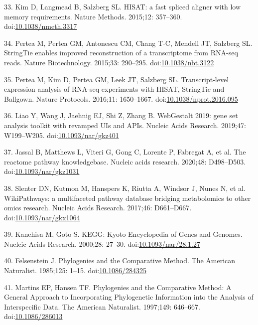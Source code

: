 \documentclass[]{elsarticle} %
\begin{document}
\leavevmode\hypertarget{ref-HISAT}{}%
33. Kim D, Langmead B, Salzberg SL. HISAT: a fast spliced aligner with
low memory requirements. Nature Methods. 2015;12: 357--360.
doi:\href{https://doi.org/10.1038/nmeth.3317}{10.1038/nmeth.3317}

\leavevmode\hypertarget{ref-StringTie}{}%
34. Pertea M, Pertea GM, Antonescu CM, Chang T-C, Mendell JT, Salzberg
SL. StringTie enables improved reconstruction of a transcriptome from
RNA-seq reads. Nature Biotechnology. 2015;33: 290--295.
doi:\href{https://doi.org/10.1038/nbt.3122}{10.1038/nbt.3122}

\leavevmode\hypertarget{ref-Tuxedo}{}%
35. Pertea M, Kim D, Pertea GM, Leek JT, Salzberg SL. Transcript-level
expression analysis of RNA-seq experiments with HISAT, StringTie and
Ballgown. Nature Protocols. 2016;11: 1650--1667.
doi:\href{https://doi.org/10.1038/nprot.2016.095}{10.1038/nprot.2016.095}

\leavevmode\hypertarget{ref-WebGestalt2019}{}%
36. Liao Y, Wang J, Jaehnig EJ, Shi Z, Zhang B. WebGestalt 2019: gene
set analysis toolkit with revamped UIs and APIs. Nucleic Acids Research.
2019;47: W199--W205.
doi:\href{https://doi.org/10.1093/nar/gkz401}{10.1093/nar/gkz401}

\leavevmode\hypertarget{ref-Reactome}{}%
37. Jassal B, Matthews L, Viteri G, Gong C, Lorente P, Fabregat A, et
al. The reactome pathway knowledgebase. Nucleic acids research. 2020;48:
D498--D503.
doi:\href{https://doi.org/10.1093/nar/gkz1031}{10.1093/nar/gkz1031}

\leavevmode\hypertarget{ref-Wikipathways}{}%
38. Slenter DN, Kutmon M, Hanspers K, Riutta A, Windsor J, Nunes N, et
al. WikiPathways: a multifaceted pathway database bridging metabolomics
to other omics research. Nucleic Acids Research. 2017;46: D661--D667.
doi:\href{https://doi.org/10.1093/nar/gkx1064}{10.1093/nar/gkx1064}

\leavevmode\hypertarget{ref-KEGG}{}%
39. Kanehisa M, Goto S. KEGG: Kyoto Encyclopedia of Genes and Genomes.
Nucleic Acids Research. 2000;28: 27--30.
doi:\href{https://doi.org/10.1093/nar/28.1.27}{10.1093/nar/28.1.27}

\leavevmode\hypertarget{ref-Felsenstein1985}{}%
40. Felsenstein J. Phylogenies and the Comparative Method. The American
Naturalist. 1985;125: 1--15.
doi:\href{https://doi.org/10.1086/284325}{10.1086/284325}

\leavevmode\hypertarget{ref-MartinsAndHansen1997}{}%
41. Martins EP, Hansen TF. Phylogenies and the Comparative Method: A
General Approach to Incorporating Phylogenetic Information into the
Analysis of Interspecific Data. The American Naturalist. 1997;149:
646--667. doi:\href{https://doi.org/10.1086/286013}{10.1086/286013}
\end{document}
